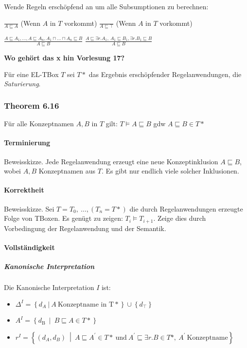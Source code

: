 Wende Regeln erschöpfend an um alle Subsumptionen zu berechnen:

$\frac{\ }{A \sqsubseteq A}$ (Wenn $A$ in $T$ vorkommt)
$\frac{\ }{A \sqsubseteq \top}$ (Wenn $A$ in $T$ vorkommt)

$\frac{A \sqsubseteq A_{1},\ldots,A \sqsubseteq A_{n},A_{1} \sqcap \ldots \sqcap A_{n} \sqsubseteq B}{A \sqsubseteq B}$
$\frac{A \sqsubseteq \exists r.A_{1},\ A_{1} \sqsubseteq B_{1},\exists r.B_{1} \sqsubseteq B}{A \sqsubseteq B}$

\textbf{Wo gehört das x hin Vorlesung 17?}

Für eine EL-TBox $T$ sei $T*$ das Ergebnis erschöpfender
Regelanwendungen, die \emph{Saturierung}.

\subsubsection{Theorem 6.16 }\label{theorem-6.16}

Für alle Konzeptnamen $A,B$ in $T$ gilt:
$T \vDash A \sqsubseteq B$ gdw $A \sqsubseteq B \in T*$

\paragraph{Terminierung}\label{terminierung-1}

Beweisskizze. Jede Regelanwendung erzeugt eine neue Konzeptinklusion
$A \sqsubseteq B$, wobei $A,B$ Konzeptnamen aus $T$. Es gibt nur
endlich viele solcher Inklusionen.

\paragraph{Korrektheit}\label{korrektheit-1}

Beweisskizze. Sei $T = T_{0},\ \ldots,(T_{n} = T*)$ die durch
Regelanwendungen erzeugte Folge von TBoxen. Es genügt zu zeigen:
$T_{i} \vDash T_{i + 1}$. Zeige dies durch Vorbedingung der
Regelanwendung und der Semantik.

\paragraph{Vollständigkeit}\label{vollstuxe4ndigkeit-1}

\subparagraph{Kanonische
Interpretation}\label{kanonische-interpretation}

Die Kanonische Interpretation $I$ ist:

\begin{itemize}
\item
  $\Delta^{I} = \left\{ d_{A}\ |\ A\ \mathrm{\text{Konzeptname\ in\ T}}* \right\} \cup \left\{ d_{\top} \right\}$
\item
  $A^{I} = \left\{ d_{\text{B\ }} \middle| \ B \sqsubseteq A \in T* \right\}$
\item
  $r^{I} = \left\{ \left( d_{A},d_{B} \right)\  \middle| \ A \sqsubseteq A^{'} \in T*\ \mathrm{\text{und}}\ A^{'} \sqsubseteq \exists r.B \in T*,\ A^{'}\ \mathrm{\text{Konzeptname}} \right\}$
\end{itemize}

